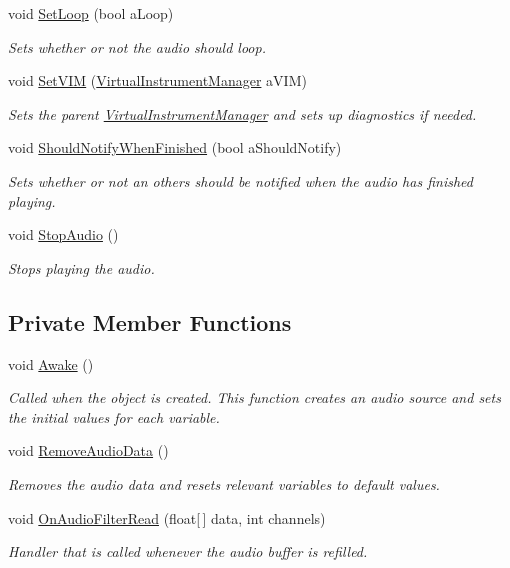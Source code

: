 \begin{DoxyCompactItemize}
void \hyperlink{group___n_o_o_pub_func_ga7b79bbd2c7a68831b322edff140f29d2}{Set\+Loop} (bool a\+Loop)
\begin{DoxyCompactList}\small\item\em Sets whether or not the audio should loop. \end{DoxyCompactList}\item 
void \hyperlink{group___n_o_o_pub_func_gaca261a6f8d95fc7f81bbc3c8108bad58}{Set\+V\+IM} (\hyperlink{class_virtual_instrument_manager}{Virtual\+Instrument\+Manager} a\+V\+IM)
\begin{DoxyCompactList}\small\item\em Sets the parent \hyperlink{class_virtual_instrument_manager}{Virtual\+Instrument\+Manager} and sets up diagnostics if needed. \end{DoxyCompactList}\item 
void \hyperlink{group___n_o_o_pub_func_gab7bad1b7d462676843be9e0bbfa1c9fb}{Should\+Notify\+When\+Finished} (bool a\+Should\+Notify)
\begin{DoxyCompactList}\small\item\em Sets whether or not an others should be notified when the audio has finished playing. \end{DoxyCompactList}\item 
void \hyperlink{group___n_o_o_pub_func_gae8a8e5bc027fd0186464a68399a4fecb}{Stop\+Audio} ()
\begin{DoxyCompactList}\small\item\em Stops playing the audio. \end{DoxyCompactList}\end{DoxyCompactItemize}
\subsection*{Private Member Functions}
\begin{DoxyCompactItemize}
\item 
void \hyperlink{group___n_o_o_unity_ga5c3cd343b7bfe7dec693d2cb69ec3cce}{Awake} ()
\begin{DoxyCompactList}\small\item\em Called when the object is created. This function creates an audio source and sets the initial values for each variable. \end{DoxyCompactList}\item 
void \hyperlink{group___n_o_o_priv_func_ga12f593bb5de83dc548eff4617fc687b5}{Remove\+Audio\+Data} ()
\begin{DoxyCompactList}\small\item\em Removes the audio data and resets relevant variables to default values. \end{DoxyCompactList}\item 
void \hyperlink{group___n_o_o_handlers_gaafd22f8a8c8d2cf101a54a4bf92782a5}{On\+Audio\+Filter\+Read} (float\mbox{[}$\,$\mbox{]} data, int channels)
\begin{DoxyCompactList}\small\item\em Handler that is called whenever the audio buffer is refilled. \end{DoxyCompactList}\end{DoxyCompactItemize}
